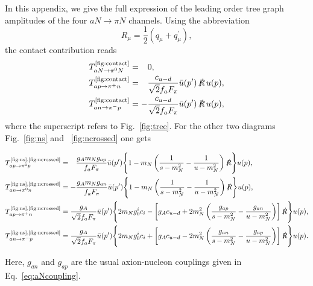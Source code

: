 \documentclass[reprint,amssymb,amsmath,floatfix,aps,prd,groupedaddress,nofootinbib]{revtex4-2}
\begin{document}
In this appendix, we give the full expression of the leading order tree graph amplitudes of the four $aN\to\pi N$ channels. Using the abbreviation
\begin{equation}
R_\mu = \frac{1}{2} \left(q_\mu + q_\mu^\prime\right) ,
\end{equation}
the contact contribution reads
\begin{align}
T^\text{\ref{fig:contact}}_{aN\to\pi^0 N} & = \phantom{-} 0  , \\
T^\text{\ref{fig:contact}}_{ap\to\pi^+ n} & = \phantom{-}\frac{c_{u-d}}{\sqrt{2}f_aF_\pi}\bar{u}(p^\prime)\,  \slashed{R}\, u(p) , \\
T^\text{\ref{fig:contact}}_{an\to\pi^- p} & = -\frac{c_{u-d}}{\sqrt{2}f_aF_\pi}\bar{u}(p^\prime) \, \slashed{R}\, u(p) ,
\end{align}
where the superscript refers to Fig.~\ref{fig:tree}. For the other two diagrams Fig.~\ref{fig:ns} and ~\ref{fig:ncrossed} one gets
\begin{widetext}
\begin{align}
T^\text{\ref{fig:ns},\ref{fig:ncrossed}}_{ap\to\pi^0 p}& =  \phantom{-} \frac{g_A m_N g_{ap}}{f_a F_\pi} \bar{u}(p^\prime) \Biggl\{ 1-m_N \left(\frac{1}{s-m_N^2}-\frac{1}{u-m_N^2} \right) \slashed{R}\Biggr\} u(p), \\ 
T^\text{\ref{fig:ns},\ref{fig:ncrossed}}_{an\to\pi^0 n}& =  - \frac{g_A m_N g_{an}}{f_a F_\pi} \bar{u}(p^\prime) \Biggl\{ 1-m_N \left(\frac{1}{s-m_N^2}-\frac{1}{u-m_N^2} \right)\slashed{R}\Biggr\} u(p), \\
T^\text{\ref{fig:ns},\ref{fig:ncrossed}}_{ap\to\pi^+ n} &= \frac{g_A}{\sqrt{2} f_a F_\pi} \bar{u}(p^\prime) \Biggl\{ 2m_N g_0^ic_i -\left[  g_A c_{u-d} + 2m_N^2 \left(\frac{g_{ap}}{s-m_N^2} -\frac{g_{an}}{u-m_N^2}\right)\right]\slashed{R}\Biggr\} u(p),\\
T^\text{\ref{fig:ns},\ref{fig:ncrossed}}_{an\to\pi^- p} & =  \frac{g_A}{\sqrt{2} f_a F_\pi} \bar{u}(p^\prime) \Biggl\{ 2m_N g_0^ic_i  + \left[ g_A c_{u-d} - 2m_N^2 \left(\frac{g_{an}}{s-m_N^2} -\frac{g_{ap}}{u-m_N^2}\right)\right]\slashed{R}\Biggr\} u(p) .
\end{align}
\end{widetext}
Here, $g_{an}$ and $g_{ap}$ are the usual axion-nucleon couplings given in Eq.~\eqref{eq:aNcoupling}.
\end{document}
